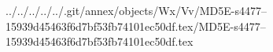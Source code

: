../../../../../.git/annex/objects/Wx/Vv/MD5E-s4477--15939d45463f6d7bf53fb74101ec50df.tex/MD5E-s4477--15939d45463f6d7bf53fb74101ec50df.tex